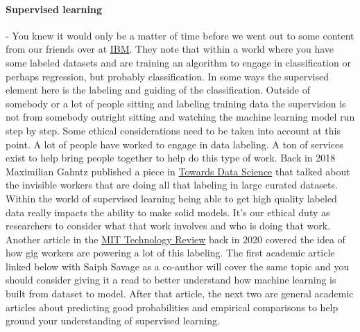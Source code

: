 \documentclass{article}
\begin{document}
\paragraph{Supervised learning} - You knew it would only be a matter of time before we went out to some content from our friends over at \href{https://www.ibm.com/cloud/learn/supervised-learning#toc-unsupervis-Fo3jDcmY }{IBM}. They note that within a world where you have some labeled datasets and are training an algorithm to engage in classification or perhaps regression, but probably classification. In some ways the supervised element here is the labeling and guiding of the classification. Outside of somebody or a lot of people sitting and labeling training data the supervision is not from somebody outright sitting and watching the machine learning model run step by step. Some ethical considerations need to be taken into account at this point. A lot of people have worked to engage in data labeling. A ton of services exist to help bring people together to help do this type of work. Back in 2018 Maximilian Gahntz published a piece in \href{https://towardsdatascience.com/the-invisible-workers-of-the-ai-era-c83735481ba}{Towards Data Science} that talked about the invisible workers that are doing all that labeling in large curated datasets. Within the world of supervised learning being able to get high quality labeled data really impacts the ability to make solid models. It’s our ethical duty as researchers to consider what that work involves and who is doing that work. Another article in the \href{https://www.technologyreview.com/2020/12/11/1014081/ai-machine-learning-crowd-gig-worker-problem-amazon-mechanical-turk/}{MIT Technology Review} back in 2020 covered the idea of how gig workers are powering a lot of this labeling. The first academic article linked below with Saiph Savage as a co-author will cover the same topic and you should consider giving it a read to better understand how machine learning is built from dataset to model. After that article, the next two are general academic articles about predicting good probabilities and empirical comparisons to help ground your understanding of supervised learning. 
\end{document}
